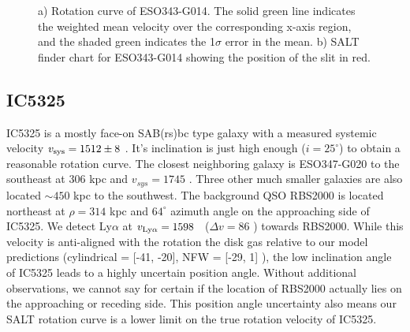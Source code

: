 \begin{figure}[ht]
\centering
  \caption{\small{a) Rotation curve of ESO343-G014. The solid green line indicates the weighted mean velocity over the corresponding x-axis region, and the shaded green indicates the 1$\sigma$ error in the mean. b) SALT finder chart for ESO343-G014 showing the position of the slit in red.}}
\vspace{0pt}
\end{figure}


\subsection{IC5325}
IC5325 is a mostly face-on SAB(rs)bc type galaxy with a measured systemic velocity $v_{\rm sys} = 1512 \pm 8$ \kms. It's inclination is just high enough ($i = 25^{\circ}$) to obtain a reasonable rotation curve. The closest neighboring galaxy is ESO347-G020 to the southeast at 306 kpc and $v_{sys} = 1745$ \kms. Three other much smaller galaxies are also located $\sim 450$ kpc to the southwest. The background QSO RBS2000 is located northeast at $\rho = 314$ kpc and  $64^{\circ}$ azimuth angle on the approaching side of IC5325. We detect Ly$\alpha$ at $v_{\rm Ly\alpha} = 1598$ \kms~($\Delta v = 86$ \kms) towards RBS2000. While this velocity is anti-aligned with the rotation the disk gas relative to our model predictions (cylindrical = [-41, -20], NFW = [-29, 1] \kms), the low inclination angle of IC5325 leads to a highly uncertain position angle. Without additional observations, we cannot say for certain if the location of RBS2000 actually lies on the approaching or receding side. This position angle uncertainty also means our SALT rotation curve is a lower limit on the true rotation velocity of IC5325.

